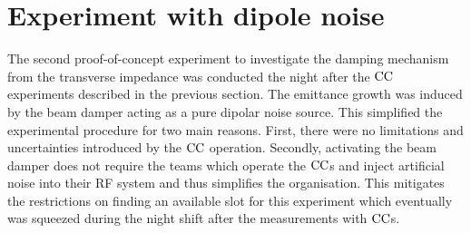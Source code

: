 




\section{Experiment with dipole noise}\label{sec:coast_md_damper_2022}
The second proof-of-concept experiment to investigate the damping mechanism from the transverse impedance was conducted the night after the ${\mathrm{CC}}$ experiments described in the previous section. The emittance growth was induced by the beam damper acting as a pure dipolar noise source. This simplified the experimental procedure for two main reasons. First, there were no limitations and uncertainties introduced by the ${\mathrm{CC}}$ operation. Secondly, activating the beam damper does not require the teams which operate the ${\mathrm{CC}}$s and inject artificial noise into their RF system and thus simplifies the organisation. This mitigates the restrictions on finding an available slot for this experiment which eventually was squeezed during the night shift after the measurements with ${\mathrm{CC}}$s. %


